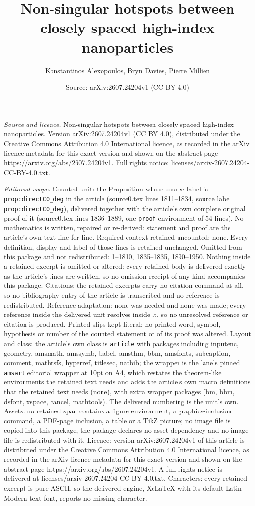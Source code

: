 \documentclass[10pt,a4paper]{amsart}
\title[Non-singular hotspots between closely spaced high-index nano]{Non-singular hotspots between closely spaced high-index nanoparticles}
\author{Konstantinos Alexopoulos, Bryn Davies, Pierre Millien}
\date{Source: arXiv:2607.24204v1 (CC BY 4.0)}
\begin{document}
\maketitle

\noindent\emph{Source and licence.} Non-singular hotspots between closely spaced high-index nanoparticles. Version arXiv:2607.24204v1 (CC BY 4.0), distributed under the Creative Commons Attribution 4.0 International licence, as recorded in the arXiv licence metadata for this exact version and shown on the abstract page https://arxiv.org/abs/2607.24204v1. Full rights notice: licenses/arxiv-2607.24204-CC-BY-4.0.txt.\par\smallskip

\noindent\textit{Editorial scope.} Counted unit: the Proposition whose source label is \texttt{prop:directC0\_deg} in the article (source0.tex lines 1811--1834, source label \texttt{prop:directC0\_deg}), delivered together with the article's own complete original proof of it (source0.tex lines 1836--1889, one \texttt{proof} environment of 54 lines). No mathematics is written, repaired or re-derived: statement and proof are the article's own text line for line. Required context retained uncounted: none. Every definition, display and label of those lines is retained unchanged. Omitted from this package and not redistributed: 1--1810, 1835--1835, 1890--1950. Nothing inside a retained excerpt is omitted or altered: every retained body is delivered exactly as the article's lines are written, so no omission receipt of any kind accompanies this package. Citations: the retained excerpts carry no citation command at all, so no bibliography entry of the article is transcribed and no reference is redistributed. Reference adaptation: none was needed and none was made; every reference inside the delivered unit resolves inside it, so no unresolved reference or citation is produced. Printed slips kept literal: no printed word, symbol, hypothesis or number of the counted statement or of its proof was altered. Layout and class: the article's own class is \texttt{article} with packages including inputenc, geometry, amsmath, amssymb, babel, amsthm, bbm, amsfonts, subcaption, comment, mathrsfs, hyperref, titlesec, natbib; the wrapper is the lane's pinned \texttt{amsart} editorial wrapper at 10pt on A4, which restates the theorem-like environments the retained text needs and adds the article's own macro definitions that the retained text needs (none), with extra wrapper packages (bm, bbm, dsfont, xspace, cancel, mathtools). The delivered numbering is the unit's own. Assets: no retained span contains a figure environment, a graphics-inclusion command, a PDF-page inclusion, a table or a TikZ picture; no image file is copied into this package, the package declares no asset dependency and no image file is redistributed with it. Licence: version arXiv:2607.24204v1 of this article is distributed under the Creative Commons Attribution 4.0 International licence, as recorded in the arXiv licence metadata for this exact version and shown on the abstract page https://arxiv.org/abs/2607.24204v1. A full rights notice is delivered at licenses/arxiv-2607.24204-CC-BY-4.0.txt. Characters: every retained excerpt is pure ASCII, so the delivered engine, XeLaTeX with its default Latin Modern text font, reports no missing character.
\end{document}
